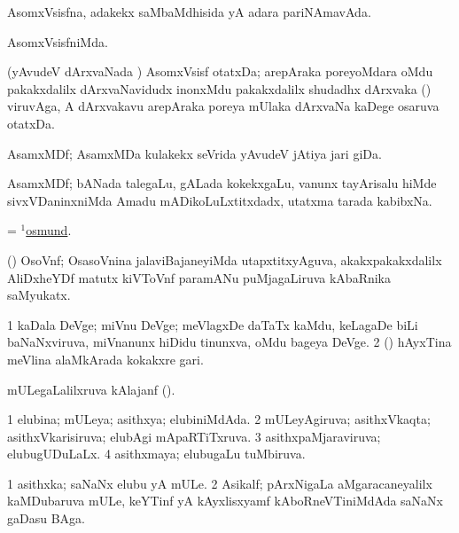 \bentry
{}
\gl{\gu}
\bmng
AsomxVsisfna, adakekx saMbaMdhisida yA adara pariNAmavAda. 
\emng
\eentry

\bentry
{}
\gl{\kirxvi}
\bmng
AsomxVsisfniMda. 
\emng
\eentry

\bentry
{}
\gl{\nA}
\bmng
(yAvudeV dArxvaNada \vi) AsomxVsisf otatxDa; arepAraka poreyoMdara oMdu pakakxdalilx dArxvaNavidudx inonxMdu pakakxdalilx shudadhx dArxvaka () viruvAga, A dArxvakavu arepAraka poreya mUlaka dArxvaNa kaDege osaruva otatxDa. 
\emng
\eentry

\bentry
{}
\gl{\nA}
\bmng
AsamxMDf; AsamxMDa kulakekx seVrida yAvudeV jAtiya jari giDa. 
\emng
\eentry

\bentry
{}
\gl{\nA}
\bmng
AsamxMDf; bANada talegaLu, gALada kokekxgaLu, \mo vanunx tayArisalu hiMde sivxVDaninxniMda Amadu mADikoLuLxtitxdadx, utatxma tarada kabibxNa. 
\emng
\eentry

\bentry
{}
\gl{\nA}
\bmng
= \hyperlink{osmund(1)}{$^1$osmund}. 
\emng
\eentry

\bentry
{}
\gl{\nA}
\bmng
(\ravi) OsoVnf; OsasoVnina jalaviBajaneyiMda utapxtitxyAguva, akakxpakakxdalilx AliDxheYDf matutx kiVToVnf paramANu puMjagaLiruva kAbaRnika saMyukatx. 
\emng
\eentry

\bentry
{}
\gl{\nA}
\bmng
\bnum
\num{1} kaDala DeVge; miVnu DeVge; meVlagxDe daTaTx kaMdu, keLagaDe biLi baNaNxviruva, miVnanunx hiDidu tinunxva, oMdu bageya DeVge.  
\num{2} (\AseTxrXV) hAyxTina meVlina alaMkArada kokakxre gari. 
\enum
\emng
\eentry

\bentry
{}
\gl{\nA}
\bmng
mULegaLalilxruva kAlajanf (). 
\emng
\eentry

\bentry
{}
\gl{\gu}
\bmng
\bnum
\num{1} elubina; mULeya; asithxya; elubiniMdAda. 
\num{2} mULeyAgiruva; asithxVkaqta; asithxVkarisiruva; elubAgi mApaRTiTxruva. 
\num{3} asithxpaMjaraviruva; elubugUDuLaLx. 
\num{4} asithxmaya; elubugaLu tuMbiruva. 
\enum
\emng
\eentry

\bentry
{}
\gl{\nA}
\bmng
\bnum
\num{1} asithxka; saNaNx elubu yA mULe. 
\num{2} Asikalf; pArxNigaLa aMgaracaneyalilx kaMDubaruva mULe, keYTinf yA kAyxlisxyamf kAboRneVTiniMdAda saNaNx gaDasu BAga. 
\enum
\emng
\eentry

